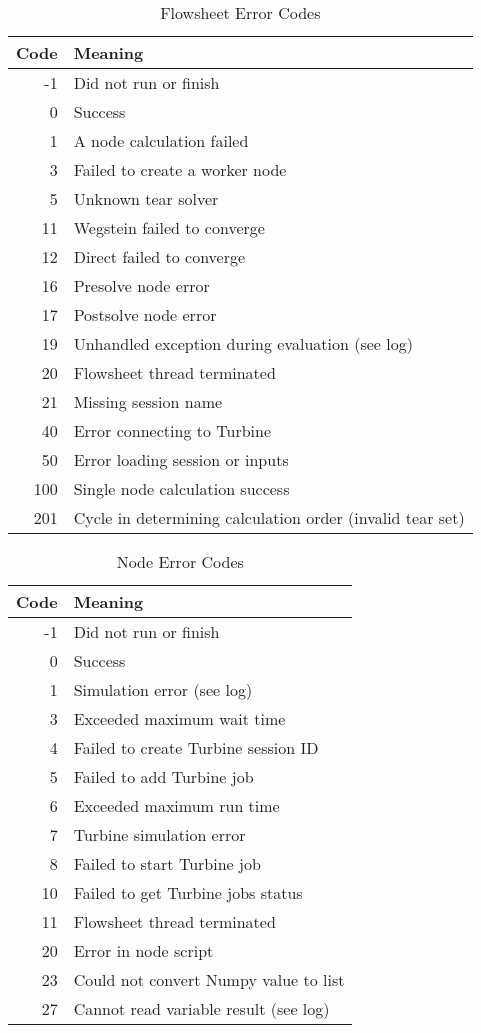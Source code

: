 \begin{table}[H]
	\begin{center}
		\caption{Flowsheet Error Codes}\label{table.fs.error}
		\begin{tabularx}{4.5in}{r l}
			\hline
			Code & Meaning \\
			\hline
			-1 & Did not run or finish  \\
			 0 & Success \\
			 1 & A node calculation failed \\
			 3 & Failed to create a worker node \\
			 5 & Unknown tear solver \\
			11 & Wegstein failed to converge \\
			12 & Direct failed to converge \\
			16 & Presolve node error \\
			17 & Postsolve node error \\
			19 & Unhandled exception during evaluation (see log)\\
			20 & Flowsheet thread terminated \\
			21 & Missing session name \\
			40 & Error connecting to Turbine \\
			50 & Error loading session or inputs \\
			100 & Single node calculation success \\
			201 & Cycle in determining calculation order (invalid tear set) \\
			\hline
		\end{tabularx}
	\end{center}
\end{table}

\begin{table}[H]
	\begin{center}
		\caption{Node Error Codes}\label{table.node.error}
		\begin{tabularx}{4.5in}{r l}
			\hline
			Code & Meaning \\
			\hline
			-1 & Did not run or finish  \\
			0 & Success \\
			1 & Simulation error (see log) \\
			3 & Exceeded maximum wait time \\
			4 & Failed to create Turbine session ID \\
			5 & Failed to add Turbine job \\
			6 & Exceeded maximum run time\\
			7 & Turbine simulation error \\
			8 & Failed to start Turbine job \\
		   10 & Failed to get Turbine jobs status \\
		   11 & Flowsheet thread terminated \\
		   20 & Error in node script\\
		   23 & Could not convert Numpy value to list \\
		   27 & Cannot read variable result (see log)\\
			\hline
		\end{tabularx}
	\end{center}
\end{table}